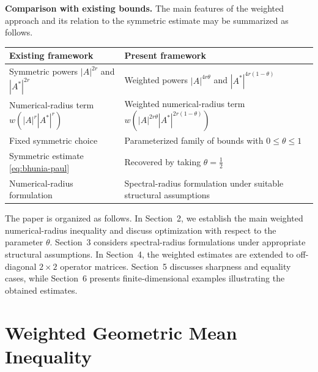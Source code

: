 \documentclass[final,1p,times]{elsarticle}
\begin{document}
\medskip

\noindent\textbf{Comparison with existing bounds.}
The main features of the weighted approach and its relation to the symmetric
estimate may be summarized as follows.

\medskip

\begin{center}
\renewcommand{\arraystretch}{1.3}
\begin{tabular}{|p{}|p{}|}
\hline
\textbf{Existing framework}
&
\textbf{Present framework}
\\
\hline
Symmetric powers $|A|^{2r}$ and $|A^*|^{2r}$
&
Weighted powers $|A|^{4r\theta}$ and
$|A^*|^{4r(1-\theta)}$
\\
\hline
Numerical-radius term
$w(|A|^r|A^*|^r)$
&
Weighted numerical-radius term
$w\!\left(|A|^{2r\theta}|A^*|^{2r(1-\theta)}\right)$
\\
\hline
Fixed symmetric choice
&
Parameterized family of bounds with
$0\leq\theta\leq1$
\\
\hline
Symmetric estimate \eqref{eq:bhunia-paul}
&
Recovered by taking $\theta=\frac12$
\\
\hline
Numerical-radius formulation
&
Spectral-radius formulation under suitable structural assumptions
\\
\hline
\end{tabular}
\end{center}

\medskip

The paper is organized as follows. In Section~2, we establish the main
weighted numerical-radius inequality and discuss optimization with respect
to the parameter $\theta$. Section~3 considers spectral-radius formulations
under appropriate structural assumptions. In Section~4, the weighted
estimates are extended to off-diagonal $2\times2$ operator matrices.
Section~5 discusses sharpness and equality cases, while Section~6 presents
finite-dimensional examples illustrating the obtained estimates.




















\section{Weighted Geometric Mean Inequality}
\end{document}

